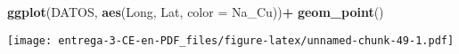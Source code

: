 \documentclass[
]{article}
\newenvironment{Shaded}{\begin{snugshade}}{\end{snugshade}}
\newcommand{\DataTypeTok}[1]{\textcolor[rgb]{0.13,0.29,0.53}{#1}}
\newcommand{\DecValTok}[1]{\textcolor[rgb]{0.00,0.00,0.81}{#1}}
\newcommand{\KeywordTok}[1]{\textcolor[rgb]{0.13,0.29,0.53}{\textbf{#1}}}
\newcommand{\NormalTok}[1]{#1}
\newcommand{\OperatorTok}[1]{\textcolor[rgb]{0.81,0.36,0.00}{\textbf{#1}}}
\newcommand{\StringTok}[1]{\textcolor[rgb]{0.31,0.60,0.02}{#1}}
\begin{document}
\begin{Shaded}
\begin{Highlighting}[]
\KeywordTok{ggplot}\NormalTok{(DATOS, }\KeywordTok{aes}\NormalTok{(Long, Lat, }\DataTypeTok{color =}\NormalTok{ Na_Cu))}\OperatorTok{+}
\StringTok{  }\KeywordTok{geom_point}\NormalTok{()}
\end{Highlighting}
\end{Shaded}

\texttt{[image: entrega-3-CE-en-PDF\_files/figure-latex/unnamed-chunk-49-1.pdf]}

\begin{Shaded}
\end{Shaded}
\end{document}
